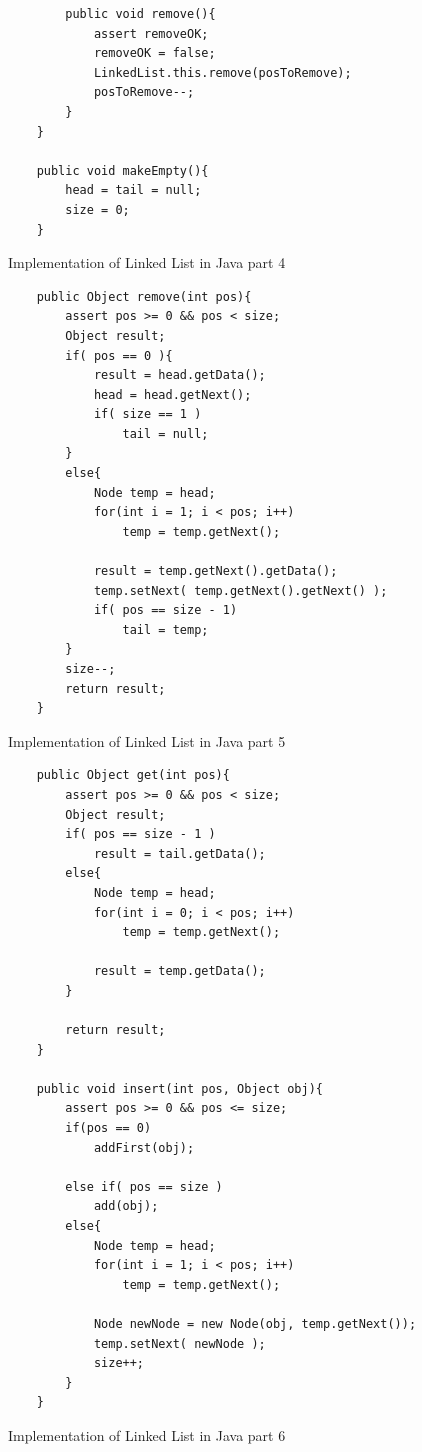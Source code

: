 \begin{figure}[H]
	\begin{lstlisting}
		public void remove(){
			assert removeOK;
			removeOK = false;
			LinkedList.this.remove(posToRemove);
			posToRemove--;
		}
	}
	
	public void makeEmpty(){
		head = tail = null;
		size = 0;
	}
	\end{lstlisting}
	\caption{Implementation of Linked List in Java part 4}
	\label{fig26}
\end{figure}
\begin{figure}[H]
	\begin{lstlisting}
	public Object remove(int pos){
		assert pos >= 0 && pos < size;
		Object result;
		if( pos == 0 ){
			result = head.getData();
			head = head.getNext();
			if( size == 1 )
				tail = null;
		}
		else{    
			Node temp = head;
			for(int i = 1; i < pos; i++)
				temp = temp.getNext();
				
			result = temp.getNext().getData();
			temp.setNext( temp.getNext().getNext() );
			if( pos == size - 1)
				tail = temp;
		}
		size--;
		return result;
	}
	\end{lstlisting}
	\caption{Implementation of Linked List in Java part 5}
	\label{fig27}
\end{figure}
\begin{figure}[H]
	\begin{lstlisting}
	public Object get(int pos){
		assert pos >= 0 && pos < size;
		Object result;
		if( pos == size - 1 )
			result = tail.getData();
		else{
			Node temp = head;
			for(int i = 0; i < pos; i++)
				temp = temp.getNext();
				
			result = temp.getData();
		}
		
		return result;
	}
	
	public void insert(int pos, Object obj){
		assert pos >= 0 && pos <= size;
		if(pos == 0)
			addFirst(obj);
		
		else if( pos == size )
			add(obj);
		else{
			Node temp = head;
			for(int i = 1; i < pos; i++)
				temp = temp.getNext();
			
			Node newNode = new Node(obj, temp.getNext());
			temp.setNext( newNode );
			size++;
		}
	}
	\end{lstlisting}
	\caption{Implementation of Linked List in Java part 6}
	\label{fig28}
\end{figure}
